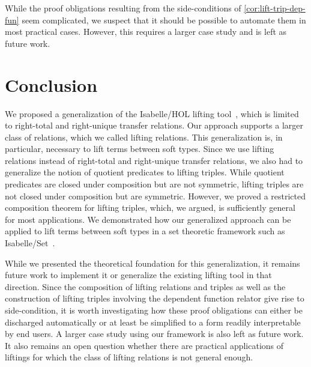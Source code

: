 \documentclass{article}
\theoremstyle{definition}
\newcommand{\liftrels}{lifting relations\xspace}
\begin{document}
While the proof obligations resulting from the side-conditions of \cref{cor:lift-trip-dep-fun} seem complicated,
we suspect that it should be possible to automate them in most practical cases.
However, this requires a larger case study and is left as future work.

\section{Conclusion}\label{sec:concl}
We proposed a generalization of the Isabelle/HOL lifting tool~\cite{huffman2013lifting},
which is limited to right-total and right-unique transfer relations.
Our approach supports a larger class of relations, which we called \liftrels.
This generalization is, in particular,
necessary to lift terms between soft types.
Since we use \liftrels instead of right-total and right-unique transfer relations,
we also had to generalize the notion of quotient predicates to lifting triples.
While quotient predicates are closed under composition but are not symmetric,
lifting triples are not closed under composition but are symmetric.
However, we proved a restricted composition theorem for lifting triples, which, we argued, is sufficiently general for most applications.
We demonstrated how our generalized approach can be applied to lift terms between soft types in a set theoretic framework such as Isabelle/Set~\cite{isabelleset}.

While we presented the theoretical foundation for this generalization,
it remains future work to implement it or generalize the existing lifting tool in that direction.
Since the composition of lifting relations and triples as well as the construction of lifting triples involving the dependent function relator give rise to side-condition,
it is worth investigating how these proof obligations can either be discharged automatically or at least be simplified to a form readily interpretable by end users.
A larger case study using our framework is also left as future work.
It also remains an open question whether there are practical applications
of liftings for which the class of \liftrels is not general enough.


\end{document}
